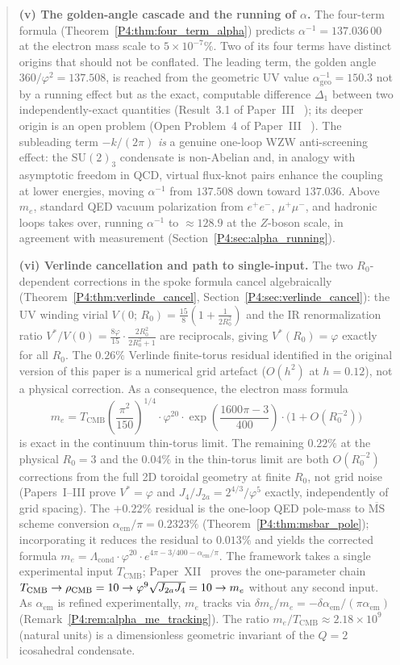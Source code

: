\documentclass[11pt,a4paper]{article}
\theoremstyle{definition}
\theoremstyle{remark}
\newcommand{\vp}{\varphi}
\newcommand{\Ja}{J_{2a}}
\newcommand{\Jfour}{J_{4}}
\newcommand{\TCMB}{T_{\mathrm{CMB}}}
\newcommand{\aInv}{\alpha^{-1}}
\newcommand{\aem}{\alpha_{\mathrm{em}}}
\newcommand{\Lcond}{\Lambda_{\mathrm{cond}}}
\begin{document}
\begin{abstract}
\textbf{(v) The golden-angle cascade and the running of $\alpha$.}
The four-term formula (Theorem~\ref{P4:thm:four_term_alpha}) predicts
$\aInv = 137.036\,00$ at the electron mass scale to $5\times10^{-7}\%$.
Two of its four terms have distinct origins that should not be
conflated. The leading term, the golden angle $360/\vp^2=137.508$, is
reached from the geometric UV value $\aInv_{\mathrm{geo}}=150.3$ not by
a running effect but as the exact, computable difference $\Delta_1$
between two independently-exact quantities (Result~3.1 of Paper~III~\cite{Paper3}%
); its deeper origin is an open
problem (Open Problem~4 of Paper~III~\cite{Paper3}%
). The
subleading term $-k/(2\pi)$ \emph{is} a genuine one-loop WZW
anti-screening effect: the $\mathrm{SU}(2)_3$ condensate is
non-Abelian and, in analogy with asymptotic freedom in QCD, virtual
flux-knot pairs enhance the coupling at lower energies, moving $\aInv$
from $137.508$ down toward $137.036$. Above $m_e$, standard QED vacuum
polarization from $e^+e^-$, $\mu^+\mu^-$, and hadronic loops takes
over, running $\aInv$ to $\approx 128.9$ at the $Z$-boson scale, in
agreement with measurement (Section~\ref{P4:sec:alpha_running}).

\textbf{(vi) Verlinde cancellation and path to single-input.}
The two $R_0$-dependent corrections in the spoke formula cancel
algebraically (Theorem~\ref{P4:thm:verlinde_cancel},
Section~\ref{P4:sec:verlinde_cancel}): the UV winding virial
$V(0;\,R_0) = \tfrac{15}{8}(1+\tfrac{1}{2R_0^2})$ and the IR
renormalization ratio $V^*/V(0) = \tfrac{8\vp}{15}\cdot\tfrac{2R_0^2}{2R_0^2+1}$
are reciprocals, giving $V^*(R_0)=\vp$ exactly for all $R_0$.
The $0.26\%$ Verlinde finite-torus residual identified in the original
version of this paper is a numerical grid artefact ($O(h^2)$ at $h=0.12$),
not a physical correction.
As a consequence, the electron mass formula
\[
  m_e = \TCMB\!\left(\frac{\pi^2}{150}\right)^{\!\!1/4}
        \cdot\vp^{20}\cdot
        \exp\!\left(\frac{1600\pi-3}{400}\right)
        \cdot\bigl(1+O(R_0^{-2})\bigr)
\]
is exact in the continuum thin-torus limit.
The remaining $0.22\%$ at the physical $R_0=3$ and the $0.04\%$
in the thin-torus limit are both $O(R_0^{-2})$ corrections
from the full 2D toroidal geometry at finite $R_0$, not grid noise
(Papers~I--III prove $V^*=\vp$ and $J_4/J_{2a}=2^{4/3}/\vp^5$ exactly,
independently of grid spacing).
The $+0.22\%$ residual is the one-loop QED pole-mass to
$\overline{\mathrm{MS}}$ scheme conversion $\aem/\pi = 0.2323\%$
(Theorem~\ref{P4:thm:msbar_pole}); incorporating it reduces the residual to
$0.013\%$ and yields the corrected formula
$m_e = \Lcond\cdot\vp^{20}\cdot e^{4\pi-3/400-\aem/\pi}$.
The framework takes a single experimental input $\TCMB$;
Paper~XII~\cite{Paper12} proves the one-parameter chain
$\TCMB\to\rho_{\rm CMB}=10\to\vp^9\sqrt{\Ja\Jfour}=10\to m_e$
without any second input.
As $\aem$ is refined experimentally, $m_e$ tracks via
$\delta m_e/m_e = -\delta\aem/(\pi\aem)$ (Remark~\ref{P4:rem:alpha_me_tracking}).
The ratio $m_e/\TCMB \approx 2.18\times10^9$ (natural units) is a
dimensionless geometric invariant of the $Q=2$ icosahedral condensate.


\end{abstract}
\end{document}
